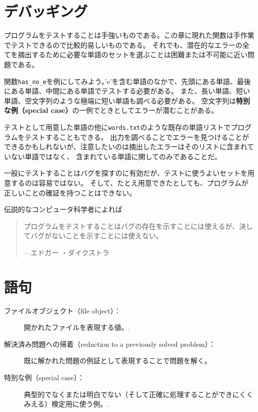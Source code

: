 \documentclass[a4j,12pt,makeidx]{jbook}
\begin{document}
\section{デバッギング}
プログラムをテストすることは手強いものである。この章に現れた関数は手作業でテストできるので比較的易しいものである。
それでも、潜在的なエラーの全てを摘出するために必要な単語のセットを選ぶことは困難または不可能に近い問題である。 \par
関数{\tt has\_no\_e}を例にしてみよう。'e'を含む単語のなかで、先頭にある単語、最後にある単語、中間にある単語でテストする必要がある。
また、長い単語、短い単語、空文字列のような極端に短い単語も調べる必要がある。
空文字列は{\bf 特別な例（special case）}の一例でときとしてエラーが潜むことがある。\par
テストとして用意した単語の他に{\tt words.txt}のような既存の単語リストでプログラムをテストすることもできる。
出力を調べることでエラーを見つけることができるかもしれないが、注意したいのは摘出したエラーはそのリストに含まれていない単語ではなく、
含まれている単語に関してのみであることだ。 \par
一般にテストすることはバグを探すのに有効だが、テストに使うよいセットを用意するのは容易ではない。
そして、たとえ用意できたとしても、プログラムが正しいことの確証を持つことはできない。\par
伝説的なコンピュータ科学者によれば
\begin{quote}
プログラムをテストすることはバグの存在を示すことには使えるが、決してバグがないことを示すことには使えない。\par
---エドガー ・ダイクストラ
\end{quote}
%
\section{語句}
\begin{description}

\item[ファイルオブジェクト（file object）：] 開かれたファイルを表現する値。.

\item[解決済み問題への帰着（reduction to a previously solved problem）：] 既に解かれた問題の例証として表現することで問題を解く。

\item[特別な例（special case）：] 典型的でなくまたは明白でない（そして正確に処理することができにくくみえる）検定用に使う例。.

\end{description}
%
\end{document}
